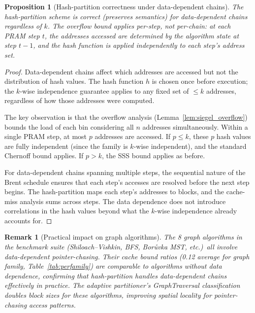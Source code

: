 \documentclass[11pt]{article}
\newtheorem{proposition}[theorem]{Proposition}
\newtheorem{remark}[theorem]{Remark}
\begin{document}
\begin{proposition}[Hash-partition correctness under data-dependent chains]
\label{prop:datadep}
The hash-partition scheme is correct (preserves semantics) for
data-dependent chains regardless of $k$.  The overflow bound applies
per-step, not per-chain: at each PRAM step $t$, the addresses accessed
are determined by the algorithm state at step $t-1$, and the hash
function is applied independently to each step's address set.
\end{proposition}

\begin{proof}
Data-dependent chains affect which addresses are accessed but not the
distribution of hash values.  The hash function $h$ is chosen once before
execution; the $k$-wise independence guarantee applies to any fixed set
of $\le k$ addresses, regardless of how those addresses were computed.

The key observation is that the overflow analysis (Lemma~\ref{lem:siegel_overflow})
bounds the load of each bin considering all $n$ addresses simultaneously.
Within a single PRAM step, at most $p$ addresses are accessed.  If $p \le k$,
these $p$ hash values are fully independent (since the family is $k$-wise
independent), and the standard Chernoff bound applies.  If $p > k$, the SSS
bound applies as before.

For data-dependent chains spanning multiple steps, the sequential nature of
the Brent schedule ensures that each step's accesses are resolved before
the next step begins.  The hash-partition maps each step's addresses to
blocks, and the cache-miss analysis sums across steps.  The data dependence
does not introduce correlations in the hash values beyond what the $k$-wise
independence already accounts for.
\end{proof}

\begin{remark}[Practical impact on graph algorithms]
The 8 graph algorithms in the benchmark suite (Shiloach--Vishkin, BFS,
Bor\r{u}vka MST, etc.)\ all involve data-dependent pointer-chasing.
Their cache bound ratios (0.12 average for graph family, Table~\ref{tab:perfamily})
are comparable to algorithms without data dependence, confirming that
hash-partition handles data-dependent chains effectively in practice.
The adaptive partitioner's GraphTraversal classification doubles block
sizes for these algorithms, improving spatial locality for pointer-chasing
access patterns.
\end{remark}
\end{document}
